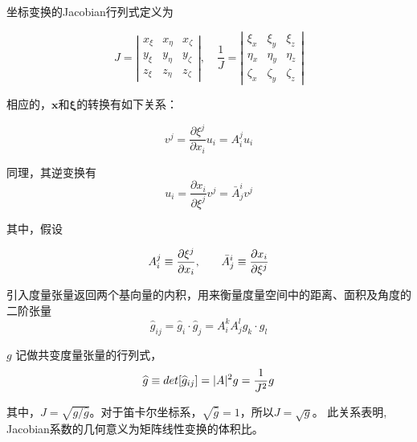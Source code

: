 \documentclass[MathematicsNumericsDerivationsAndOpenFOAM.tex]{subfiles}
\begin{document}
坐标变换的Jacobian行列式定义为

\begin{equation}
  J=\left|\begin{array}{lll}
    x_{\xi} & x_{\eta} & x_{\zeta} \\
    y_{\xi} & y_{\eta} & y_{\zeta} \\
    z_{\xi} & z_{\eta} & z_{\zeta}
  \end{array}\right|  ,
  \quad \frac{1}{J}=\left|\begin{array}{lll}
    \xi_{x}   & \xi_{y}   & \xi_{z}   \\
    \eta_{x}  & \eta_{y}  & \eta_{z}  \\
    \zeta_{x} & \zeta_{y} & \zeta_{z}
  \end{array}\right|
\end{equation}


相应的，$\boldsymbol{x}$和$\boldsymbol{\xi}$的转换有如下关系：


\begin{equation}
  v^{j}=\frac{\partial \xi^{j}}{\partial x_{i}} u_{i}=A_{i}^{j} u_{i}
\end{equation}

同理，其逆变换有
\begin{equation}
  u_{i}=\frac{\partial x_{i}}{\partial \xi^{j}} v^{j}=\bar{A}_{j}^{i} v^{j}
\end{equation}


其中，假设

\begin{equation}
  A_{i}^{j} \equiv \frac{\partial \xi^{j}}{\partial x_{i}} { , } \quad \text \quad \bar{A}_{j}^{i} \equiv \frac{\partial x_{i}}{\partial \xi^{j}}
\end{equation}

引入度量张量返回两个基向量的内积，用来衡量度量空间中的距离、面积及角度的二阶张量
\begin{equation}
  \widehat{g}_{i j}=\widehat{g}_{i} \cdot \widehat{g}_{j}=A_{i}^{k} A_{j}^{l} g_{k } \cdot  g_{l }
\end{equation}


$g $ 记做共变度量张量的行列式，
\begin{equation}
  \widehat{g} \equiv det[\widehat{g}_{i j}]=|A|^{2} g = {1\over J^2} g
\end{equation}

其中，$J=\sqrt{g / \widehat{g}}$。对于笛卡尔坐标系，$\sqrt{\widehat{g}}=1$，所以$J=\sqrt{g}$。
此关系表明, Jacobian系数的几何意义为矩阵线性变换的体积比。
\end{document}
